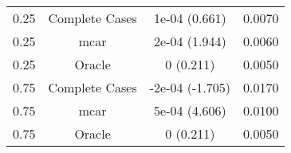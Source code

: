 \begin{table}[ht]
\centering
\begin{tabular}{cccc}
  \hline
  \hline
0.25 & Complete Cases & 1e-04 (0.661) & 0.0070 \\ 
  0.25 & mcar & 2e-04 (1.944) & 0.0060 \\ 
  0.25 & Oracle & 0 (0.211) & 0.0050 \\ 
  0.75 & Complete Cases & -2e-04 (-1.705) & 0.0170 \\ 
  0.75 & mcar & 5e-04 (4.606) & 0.0100 \\ 
  0.75 & Oracle & 0 (0.211) & 0.0050 \\ 
   \hline
\end{tabular}
\end{table}
